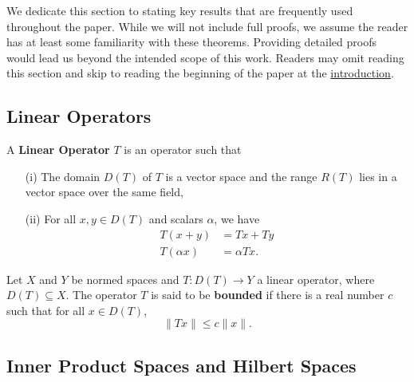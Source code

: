 We dedicate this section to stating key results that are frequently used throughout the paper. While we will not include full proofs, we assume the reader has at least some familiarity with these theorems. Providing detailed proofs would lead us beyond the intended scope of this work. Readers may omit reading this section and skip to reading the beginning of the paper at the {\hyperref[section 2]{introduction}}.

\subsection{Linear Operators}

\begin{definition}
    A \textbf{Linear Operator} \( T  \) is an operator such that
    \begin{enumerate}
        \item[(i)] The domain \( D(T) \) of \( T  \) is a vector space and the range \( R(T) \) lies in a vector space over the same field,
        \item[(ii)] For all \( x,y \in D(T) \) and scalars \( \alpha  \), we have
            \begin{align*}
                T(x + y) &= Tx + Ty \\
                T(\alpha x) &= \alpha Tx.
            \end{align*}
    \end{enumerate}
\end{definition}

\begin{definition}
    Let \( X  \) and \( Y  \) be normed spaces and \( T : D(T) \to Y  \) a linear operator, where \( D(T) \subseteq X \). The operator \( T  \) is said to be \textbf{bounded} if there is a real number \( c  \) such that for all \( x \in D(T) \), 
    \[  \|Tx\| \leq c \|x \|. \]
\end{definition}


\subsection{Inner Product Spaces and Hilbert Spaces}

